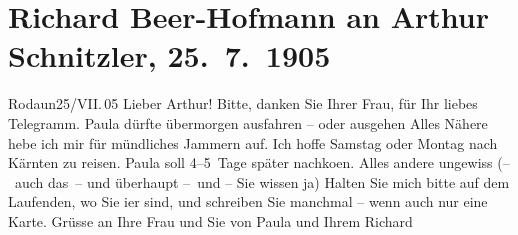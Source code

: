 

         
         \renewcommand{\erwaehntePersonen}{Personen: Paula Beer-Hofmann, Olga Schnitzler}
         \renewcommand{\erwaehnteOrte}{Orte: Kärnten, Reichenau an der Rax, Rodaun}
         \renewcommand{\erwaehnteWerke}{}
               \section[Richard Beer-Hofmann an Arthur Schnitzler, 25. 7. 1905]{ Richard Beer-Hofmann an Arthur Schnitzler, 25. 7. 1905}\nopagebreak{}\rehead{ }\begin{ledgroupsized}[t]{13cm}\normalsize\beginnumbering \toendnotes[C]{\smallbreak\pagebreak[2]} 
\toendnotes[C]{\smallbreak}\pstart
           \raggedleft{}{\pb}Rodaun25/VII. 05\pend
           \pstart
           Lieber Arthur! Bitte, danken Sie Ihrer Frau, für Ihr liebes Telegramm. Paula dürfte übermorgen ausfahren – oder ausgehen
               Alles Nähere hebe ich mir für mündliches Jammern auf. Ich hoffe Samstag
               oder Montag nach Kärnten zu reisen. Paula soll 4–5 Tage später nachko{\geminationm}en. Alles andere ungewiss (– auch das – und überhaupt
               – und – Sie wissen ja)\pend
           \pstart
           {\pb}Halten Sie mich bitte auf dem
               Laufenden, wo Sie i{\geminationm}er sind, und schreiben Sie manchmal
               – wenn auch nur eine Karte. Grüsse an Ihre Frau und Sie von Paula
               und Ihrem\pend
           \pstart \spacefill\mbox{Richard}\pend{}
         
         \endnumbering{}\end{ledgroupsized}  \newcommand{\dateiname}{L01532}\newcommand{\titel}{Richard Beer-Hofmann an Arthur Schnitzler, 25. 7. 1905}\newcommand{\editorInnen}{Martin Anton Müller und Gerd-Hermann Susen}
      